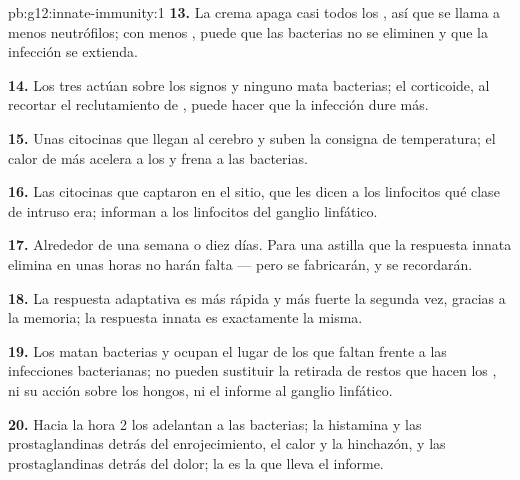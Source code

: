 \begin{solution}{pb:g12:innate-immunity:1}
\textbf{13.} La crema apaga casi todos los , así que se llama
a menos neutrófilos; con menos , puede que las bacterias no se
eliminen y que la infección se extienda.

\textbf{14.} Los tres actúan sobre los signos y ninguno mata bacterias;
el corticoide, al recortar el reclutamiento de , puede hacer
que la infección dure más.

\textbf{15.} Unas citocinas que llegan al cerebro y suben la consigna
de temperatura; el calor de más acelera a los  y frena a las
bacterias.

\textbf{16.} Las citocinas que captaron en el sitio, que les dicen a
los linfocitos qué clase de intruso era; informan a los linfocitos del
ganglio linfático.

\textbf{17.} Alrededor de una semana o diez días. Para una astilla que
la respuesta innata elimina en unas horas no harán falta --- pero se
fabricarán, y se recordarán.

\textbf{18.} La respuesta adaptativa es más rápida y más fuerte la
segunda vez, gracias a la memoria; la respuesta innata es exactamente
la misma.

\textbf{19.} Los  matan bacterias y ocupan el lugar de los
 que faltan frente a las infecciones bacterianas; no pueden
sustituir la retirada de restos que hacen los , ni su acción
sobre los hongos, ni el informe al ganglio linfático.

\textbf{20.} Hacia la hora 2 los  adelantan a las bacterias;
la histamina y las prostaglandinas detrás del enrojecimiento, el calor
y la hinchazón, y las prostaglandinas detrás del dolor; la  es la que lleva el informe.
\end{solution}
